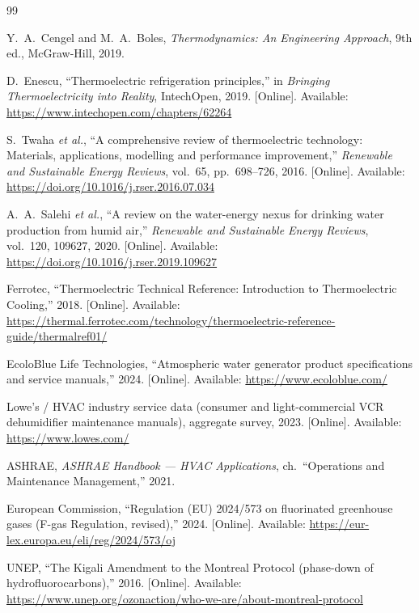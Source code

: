 \documentclass[11pt,a4paper]{article}
\begin{document}
\begin{thebibliography}{99}

Y.~A.~Cengel and M.~A.~Boles, \emph{Thermodynamics: An Engineering Approach}, 9th ed., McGraw-Hill, 2019.

D.~Enescu, ``Thermoelectric refrigeration principles,'' in \emph{Bringing Thermoelectricity into Reality}, IntechOpen, 2019. [Online]. Available: \url{https://www.intechopen.com/chapters/62264}

S.~Twaha \emph{et al.}, ``A comprehensive review of thermoelectric technology: Materials, applications, modelling and performance improvement,'' \emph{Renewable and Sustainable Energy Reviews}, vol.~65, pp.~698--726, 2016. [Online]. Available: \url{https://doi.org/10.1016/j.rser.2016.07.034}

A.~A.~Salehi \emph{et al.}, ``A review on the water-energy nexus for drinking water production from humid air,'' \emph{Renewable and Sustainable Energy Reviews}, vol.~120, 109627, 2020. [Online]. Available: \url{https://doi.org/10.1016/j.rser.2019.109627}

Ferrotec, ``Thermoelectric Technical Reference: Introduction to Thermoelectric Cooling,'' 2018. [Online]. Available: \url{https://thermal.ferrotec.com/technology/thermoelectric-reference-guide/thermalref01/}

EcoloBlue Life Technologies, ``Atmospheric water generator product specifications and service manuals,'' 2024. [Online]. Available: \url{https://www.ecoloblue.com/}

Lowe's / HVAC industry service data (consumer and light-commercial VCR dehumidifier maintenance manuals), aggregate survey, 2023. [Online]. Available: \url{https://www.lowes.com/}

ASHRAE, \emph{ASHRAE Handbook --- HVAC Applications}, ch.~``Operations and Maintenance Management,'' 2021.

European Commission, ``Regulation (EU) 2024/573 on fluorinated greenhouse gases (F-gas Regulation, revised),'' 2024. [Online]. Available: \url{https://eur-lex.europa.eu/eli/reg/2024/573/oj}

UNEP, ``The Kigali Amendment to the Montreal Protocol (phase-down of hydrofluorocarbons),'' 2016. [Online]. Available: \url{https://www.unep.org/ozonaction/who-we-are/about-montreal-protocol}


\end{thebibliography}
\end{document}
